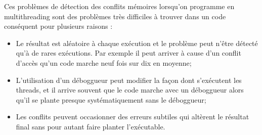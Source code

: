 \documentclass[fleqn,11pt]{article}
\begin{document}
Ces problèmes de détection des conflits mémoires lorsqu'on programme en multithreading sont des problèmes
très difficiles à trouver dans un code conséquent pour plusieurs raisons :
\begin{itemize}
  \item Le résultat est aléatoire à chaque exécution et le problème peut n'être détecté qu'à de rares exécutions. Par exemple il peut arriver à cause d'un conflit d'accès qu'un code marche neuf fois sur dix en
  moyenne;
  \item L'utilisation d'un déboggueur peut modifier la façon dont s'exécutent les threads, et il arrive souvent
  que le code marche avec un déboggueur alors qu'il se plante presque systématiquement sans le déboggueur;
  \item Les conflits peuvent occasionner des erreurs subtiles qui altèrent le résultat final sans pour autant
  faire planter l'exécutable.
\end{itemize}
\end{document}
